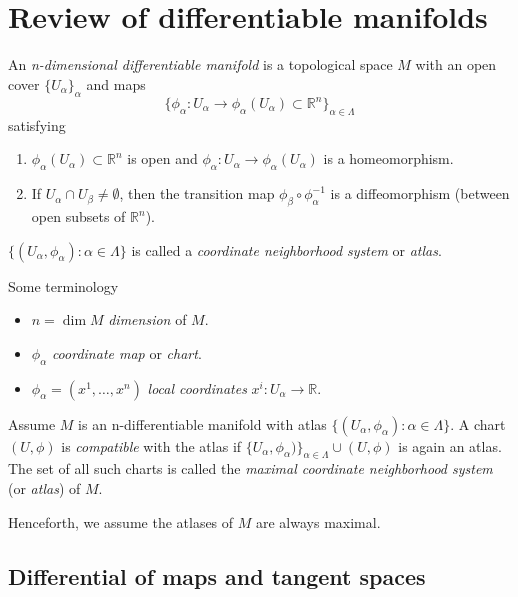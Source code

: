 \section{Review of differentiable manifolds}

\begin{definition}
An \emph{n-dimensional differentiable manifold} is a topological space $M$ 
with an open cover $\{U_{\alpha}\}_{\alpha}$ and maps
\[\{\phi_{\alpha} : U_{\alpha} \to \phi_{\alpha}(U_{\alpha})\subset\mathbb{R}^n\}_{\alpha \in \Lambda}\]
satisfying
\begin{enumerate}
    \item $\phi_{\alpha}(U_{\alpha})\subset\mathbb{R}^n$ is open and $\phi_{\alpha}:U_{\alpha} \to \phi_{\alpha}(U_{\alpha})$ is a homeomorphism.
    \item If $U_{\alpha}\cap U_{\beta}\neq \emptyset$, then the transition map $\phi_{\beta} \circ \phi_{\alpha}^{-1}$ is a diffeomorphism (between open subsets of $\mathbb{R}^n$).
\end{enumerate}
$\{(U_{\alpha}, \phi_{\alpha}) : \alpha \in \Lambda\}$ is called a \emph{coordinate neighborhood system} or \emph{atlas}.
\end{definition}

Some terminology
\begin{itemize}
\item $n = \operatorname{dim}M$ \emph{dimension} of $M$.
\item $\phi_{\alpha}$ \emph{coordinate map} or \emph{chart}.
\item $\phi_{\alpha} = (x^1, \dots, x^n)$ \emph{local coordinates} $x^i : U_{\alpha} \to \mathbb{R}$.
\end{itemize}

\begin{definition}
Assume $M$ is an n-differentiable manifold with atlas $\{(U_{\alpha}, \phi_{\alpha}) : \alpha \in \Lambda\}$. A chart $(U, \phi)$ is \emph{compatible} with the atlas if
$\{U_{\alpha}, \phi_{\alpha})\}_{\alpha \in \Lambda} \cup (U,\phi)$ is again an atlas.
The set of all such charts is called the \emph{maximal coordinate neighborhood system} (or \textit{atlas}) of $M$.
\end{definition}

Henceforth, we assume the atlases of $M$ are always maximal.

\subsection{Differential of maps and tangent spaces}

